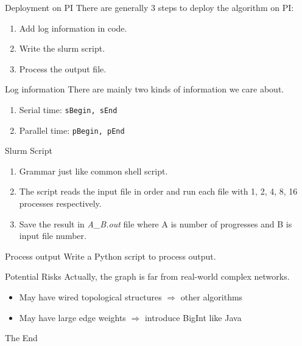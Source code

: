 \documentclass{beamer}
\begin{document}
\begin{frame}{Deployment on PI}
There are generally 3 steps to deploy the algorithm on PI:
\begin{enumerate}
	\item Add log information in code.
	\item Write the slurm script.
	\item Process the output file.
\end{enumerate}
\end{frame}

\begin{frame}[fragile]{Log information}
There are mainly two kinds of information we care about.
\begin{enumerate}
	\item Serial time: \verb|sBegin, sEnd|
	\item Parallel time: \verb|pBegin, pEnd|
\end{enumerate}
\end{frame}

\begin{frame}{Slurm Script}
\begin{enumerate}
	\item Grammar just like common shell script.
	\item The script reads the input file in order and run each file with 1, 2, 4, 8, 16 processes respectively.
	\item Save the result in \textit{A\_B.out} file where A is number of progresses and B is input file number.
\end{enumerate}
\end{frame}

\begin{frame}{Process output}
Write a Python script to process output.  
\end{frame}

\begin{frame}{Potential Risks}
Actually, the graph is far from real-world complex networks.
\begin{itemize}
\item May have wired topological structures $\Rightarrow$ other algorithms
\item May have large edge weights $\Rightarrow$ introduce BigInt like Java
\end{itemize}
\end{frame}




\begin{frame}
\Huge{\centerline{The End}}
\end{frame}

\end{document}
